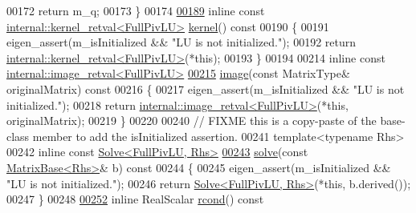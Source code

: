 \begin{DoxyCode}
00172       \textcolor{keywordflow}{return} m\_q;
00173     \}
00174 
\hyperlink{group___l_u___module_a70f52eeb2cd07dfbf790fce106fb4015}{00189}     \textcolor{keyword}{inline} \textcolor{keyword}{const} \hyperlink{struct_eigen_1_1internal_1_1kernel__retval}{internal::kernel\_retval<FullPivLU>} 
      \hyperlink{group___l_u___module_a70f52eeb2cd07dfbf790fce106fb4015}{kernel}()\textcolor{keyword}{ const}
00190 \textcolor{keyword}{    }\{
00191       eigen\_assert(m\_isInitialized && \textcolor{stringliteral}{"LU is not initialized."});
00192       \textcolor{keywordflow}{return} \hyperlink{struct_eigen_1_1internal_1_1kernel__retval}{internal::kernel\_retval<FullPivLU>}(*this);
00193     \}
00194 
00214     \textcolor{keyword}{inline} \textcolor{keyword}{const} \hyperlink{struct_eigen_1_1internal_1_1image__retval}{internal::image\_retval<FullPivLU>}
\hyperlink{group___l_u___module_a0893985d2dab367baa6e57c6fd0c4956}{00215}       \hyperlink{group___l_u___module_a0893985d2dab367baa6e57c6fd0c4956}{image}(\textcolor{keyword}{const} MatrixType& originalMatrix)\textcolor{keyword}{ const}
00216 \textcolor{keyword}{    }\{
00217       eigen\_assert(m\_isInitialized && \textcolor{stringliteral}{"LU is not initialized."});
00218       \textcolor{keywordflow}{return} \hyperlink{struct_eigen_1_1internal_1_1image__retval}{internal::image\_retval<FullPivLU>}(*\textcolor{keyword}{this}, originalMatrix);
00219     \}
00220 
00240     \textcolor{comment}{// FIXME this is a copy-paste of the base-class member to add the isInitialized assertion.}
00241     \textcolor{keyword}{template}<\textcolor{keyword}{typename} Rhs>
00242     \textcolor{keyword}{inline} \textcolor{keyword}{const} \hyperlink{group___core___module_class_eigen_1_1_solve}{Solve<FullPivLU, Rhs>}
\hyperlink{group___l_u___module_af563471f6f3283fd10779ef02dd0b748}{00243}     \hyperlink{group___l_u___module_af563471f6f3283fd10779ef02dd0b748}{solve}(\textcolor{keyword}{const} \hyperlink{group___core___module_class_eigen_1_1_matrix_base}{MatrixBase<Rhs>}& b)\textcolor{keyword}{ const}
00244 \textcolor{keyword}{    }\{
00245       eigen\_assert(m\_isInitialized && \textcolor{stringliteral}{"LU is not initialized."});
00246       \textcolor{keywordflow}{return} \hyperlink{group___core___module_class_eigen_1_1_solve}{Solve<FullPivLU, Rhs>}(*\textcolor{keyword}{this}, b.derived());
00247     \}
00248 
\hyperlink{group___l_u___module_a0bc63f910960dc3e35acecc8442025b6}{00252}     \textcolor{keyword}{inline} RealScalar \hyperlink{group___l_u___module_a0bc63f910960dc3e35acecc8442025b6}{rcond}()\textcolor{keyword}{ const}

\end{DoxyCode}
